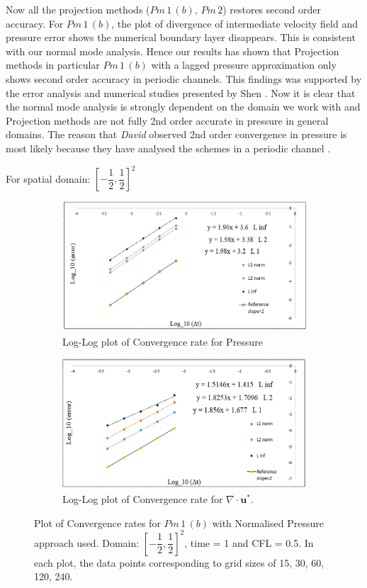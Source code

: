 Now all the projection methods ($Pm\,1\,(b),\,Pm\,2$) restores second order accuracy. For $Pm\,1\,(b)$, the plot of divergence of intermediate velocity field and pressure error shows the numerical boundary layer disappears. This is consistent with our normal mode analysis. Hence our results has shown that Projection methods in particular $Pm\,1\,(b)$ with a lagged pressure approximation only shows second order accuracy in periodic channels. This findings was supported by the error analysis and numerical studies presented by Shen \cite{guermond2004error}. Now it is clear that the normal mode analysis is strongly dependent on the domain we work with and Projection methods are not fully 2nd order accurate in pressure in general domains. The reason that \emph{David} observed 2nd order convergence in pressure is most likely because they have analysed the schemes in a periodic channel \cite{brown2001accurate, guermond2006overview, guermond2004error}.

For spatial domain: $[-\dfrac{1}{2}, \dfrac{1}{2}]^2$
\begin{figure}[H]
	\centering
	\begin{subfigure}[t]{4.5in}
		\centering
		\includegraphics[width=4.5in]{figures/Pm1b_pf2b_np_P_rate_c_0_5.jpg}
		\caption{Log-Log plot of Convergence rate for Pressure}\label{fig:6.19a}		
	\end{subfigure}
	\quad
	\begin{subfigure}[t]{4.5in}
		\centering
		\includegraphics[width=4.5in]{figures/Pm1b_pf2b_np_div_uvstar_rate_c_0_5.jpg}
		\caption{Log-Log plot of Convergence rate for $\nabla \cdot \textbf{u}^*$. }\label{fig:6.19b}
	\end{subfigure}
	\caption{Plot of Convergence rates for $Pm\,1\,(b)$ with Normalised Pressure approach used. Domain:  $[-\dfrac{1}{2}, \dfrac{1}{2}]^2$, time = 1 and CFL = 0.5. In each plot, the data points corresponding to grid sizes of 15, 30, 60, 120, 240.}\label{fig:6.16}
\end{figure}

